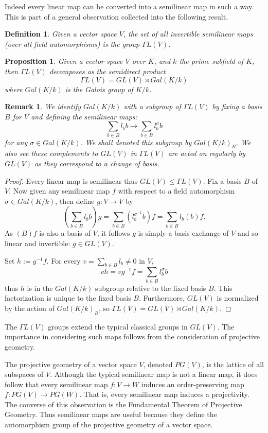 \documentclass[12pt]{article}
\newtheorem{prop}[thm]{Proposition}
\newtheorem{defn}[thm]{Definition}
\newtheorem{remark}[thm]{Remark}
\begin{document}
Indeed every linear map can be converted into a semilinear map in such a way.
This is part of a general observation collected into the following result.

\begin{defn}
Given a vector space $V$, the set of all invertible semilinear maps (over all field automorphisms) is the group $\Gamma L(V)$.
\end{defn}

\begin{prop}
Given a vector space $V$ over $K$, and $k$ the prime subfield of $K$, then
$\Gamma L(V)$ decomposes as the semidirect product
\[\Gamma L(V)=GL(V)\rtimes Gal(K/k)\]
where $Gal(K/k)$ is the Galois group of $K/k$.
\end{prop}
\begin{remark}
We identify $Gal(K/k)$ with a subgroup of $\Gamma L(V)$ by fixing a basis
$B$ for $V$ and defining the semilinear maps:
\[\sum_{b\in B} l_b b\mapsto \sum_{b\in B} l_b^\sigma b\]
for any $\sigma\in Gal(K/k)$.  We shall denoted this subgroup by $Gal(K/k)_B$.  We also see these complements to $GL(V)$ in $\Gamma L(V)$ are acted on regularly by $GL(V)$ as they correspond to a change of basis.
\end{remark}
\begin{proof}
Every linear map is semilinear thus $GL(V)\leq \Gamma L(V)$.  Fix a basis
$B$ of $V$.  Now given any semilinear map $f$ with respect to a field automorphism $\sigma\in Gal(K/k)$, then define $g:V\rightarrow V$ by \[\left(\sum_{b\in B} l_b b\right)g=\sum_{b\in B} (l_b^{\sigma^{-1}} b)f
=\sum_{b\in B} l_b (b)f.\]
As $(B)f$ is also a basis of $V$, it follows $g$ is simply a basis exchange
of $V$ and so linear and invertible: $g\in GL(V)$.

Set $h:=g^{-1}f$.  For every $v=\sum_{b\in B}l_b\neq 0$ in $V$,
\[vh=vg^{-1}f=\sum_{b\in B} l_b^{\sigma} b\]
thus $h$ is in the $Gal(K/k)$ subgroup relative to the fixed basis $B$.
This factorization is unique to the fixed basis $B$.  Furthermore, $GL(V)$ is normalized by the action of $Gal(K/k)_B$, so $\Gamma L(V)=GL(V)\rtimes Gal(K/k)$.
\end{proof}

The $\Gamma L(V)$ groups extend the typical classical groups in $GL(V)$.  The importance in considering such maps follows from the consideration of projective geometry.

The projective geometry of a vector space $V$, denoted $PG(V)$, is the lattice of all subspaces of $V$.  Although the typical semilinear map is not a linear map, it does follow that every semilinear map $f:V\rightarrow W$ induces an order-preserving map $f:PG(V)\rightarrow PG(W)$.  That is, every semilinear map induces a projectivity.  The converse of this observation is the Fundamental Theorem of Projective Geometry.  Thus semilinear maps are useful because they define the automorphism group of the projective geometry of a vector space.
\end{document}
